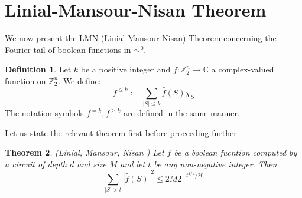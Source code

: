 \documentclass{amsart}
\newtheorem{theorem}{Theorem}[section]
\theoremstyle{definition}
\newtheorem{definition}[theorem]{Definition}
\theoremstyle{remark}
\numberwithin{equation}{section}
\theoremstyle{remark}
\begin{document}
\section{Linial-Mansour-Nisan Theorem}
We now present the LMN (Linial-Mansour-Nisan) Theorem concerning the Fourier tail of boolean functions in $\AC^0$.
\begin{definition}
  Let $k$ be a positive integer and $f:\mathbb{Z}_2^n \rightarrow \mathbb{C}$ a complex-valued function on $\mathbb{Z}_2^n$. We define: \newline
  $$f^{\leq k} := \sum_{|S| \leq k} \hat{f}(S)\chi_{S} $$
  The notation symbols $f^{=k},f^{\geq k}$ are defined in the same manner.
\end{definition}
%
\noindent Let us state the relevant theorem first before proceeding further
%
\begin{theorem} (Linial, Mansour, Nisan \cite{lmn}) \label{lmn}
    Let $f$ be a boolean fucntion computed by a circuit of depth $d$ and size $M$ and let $t$ be any non-negative integer. Then
    \begin{equation}
      \sum_{|S| > t} |\hat{f}(S)|^2 \leq 2M2^{-t^{1/d}/20}
    \end{equation}
\end{theorem}
\end{document}
